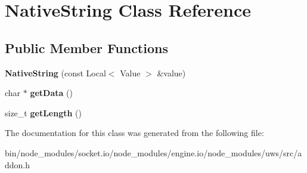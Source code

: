 \hypertarget{class_native_string}{}\section{Native\+String Class Reference}
\label{class_native_string}
\subsection*{Public Member Functions}
\begin{DoxyCompactItemize}
\item 
\mbox{\label{class_native_string_ac26e5eb75245e477a5a5f2660094e05a}} 
{\bfseries Native\+String} (const Local$<$ Value $>$ \&value)
\item 
\mbox{\label{class_native_string_ae5e19657354f287048e4935333963ce3}} 
char $\ast$ {\bfseries get\+Data} ()
\item 
\mbox{\label{class_native_string_afbd444c13fcbf145864f96a5dced24b4}} 
size\+\_\+t {\bfseries get\+Length} ()
\end{DoxyCompactItemize}


The documentation for this class was generated from the following file\+:\begin{DoxyCompactItemize}
\item 
bin/node\+\_\+modules/socket.\+io/node\+\_\+modules/engine.\+io/node\+\_\+modules/uws/src/addon.\+h\end{DoxyCompactItemize}
